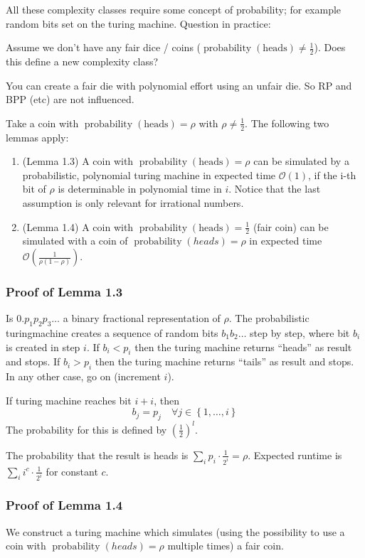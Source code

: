 \documentclass[a4paper]{article}
\newcommand{\cls}[1]{\rm{#1}}
\newcommand{\set}[1]{\left\{#1\right\}}
\DeclareMathOperator{\prop}{probability}
\begin{document}
All these complexity classes require some concept of probability;
for example random bits set on the turing machine. Question in practice:

Assume we don't have any fair dice / coins ($\prop{(\text{heads})} \neq \frac12$).
Does this define a new complexity class?

You can create a fair die with polynomial effort using an unfair die.
So \cls{RP} and \cls{BPP} (etc) are not influenced.

Take a coin with $\prop{(\text{heads})} = \rho$ with $\rho \neq \frac12$.
The following two lemmas apply:
\begin{enumerate}
  \item (Lemma 1.3) A coin with $\prop{(\text{heads})} = \rho$ can be simulated
         by a probabilistic, polynomial turing machine in expected time
         $\mathcal{O}(1)$, if the i-th bit of $\rho$ is determinable
         in polynomial time in $i$.
         Notice that the last assumption is only relevant for irrational
         numbers.
  \item (Lemma 1.4) A coin with $\prop{(\text{heads})} = \frac12$ (fair coin)
        can be simulated with a coin of $\prop(heads) = \rho$ in expected time
        $\mathcal{O}\left(\frac{1}{\rho (1-\rho)}\right)$.
\end{enumerate}

\subsubsection{Proof of Lemma 1.3}
%
Is $0.p_1 p_2 p_3\ldots$ a binary fractional representation of $\rho$.
The probabilistic turingmachine creates a sequence of random bits
$b_1 b_2 \ldots$ step by step, where bit $b_i$ is created in step $i$.
If $b_i < p_i$ then the turing machine returns ``heads'' as result and stops.
If $b_i > p_i$ then the turing machine returns ``tails'' as result and stops.
In any other case, go on (increment $i$).

If turing machine reaches bit $i+i$, then
\[
    b_j = p_j  \quad \forall j \in \set{1,\ldots,i}
\]
The probability for this is defined by $(\frac12)^l$.

The probability that the result is heads is $\sum_i p_i \cdot \frac{1}{2^i} = \rho$.
Expected runtime is $\sum_i i^c \cdot \frac{1}{2^i}$ for constant $c$.

\subsubsection{Proof of Lemma 1.4}
%
We construct a turing machine which simulates (using the possibility to
use a coin with $\prop(heads) = \rho$ multiple times) a fair coin.
\end{document}

